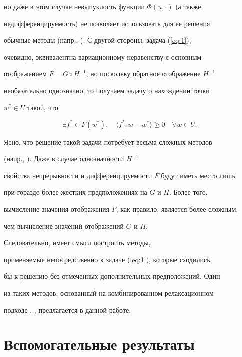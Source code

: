 но даже в этом случае невыпуклость функции $\Phi(u, \cdot)$ (а также 


недифференцируемость) не позволяет использовать для ее решения 


обычные методы (напр., \cite{Kon98}). С другой стороны, задача (\ref{eq:1}), 


очевидно, эквивалентна вариационному неравенству с основным 


отображением $F=G \circ H^{-1}$, но поскольку обратное отображение $H^{-1}$


необязательно однозначно, то получаем задачу о нахождении точки 


$w^{*} \in U$ такой, что


\begin{equation} \label{eq:5} 


\exists f^{*} \in F(w^{*}), \quad 


 \langle f^{*}, w - w^{*} \rangle \geq 0 \quad \forall w \in U. 


\end{equation}


Ясно, что решение такой задачи потребует весьма сложных методов 


(напр., \cite{Kon98}). Даже в случае однозначности $H^{-1}$


свойства непрерывности и дифференцируемости $F$ будут иметь место лишь


при гораздо более жестких предположениях на $G$ и $H$. Более того,


вычисление значения отображения $F$, как правило, является более сложным,


чем вычисление значений отображений $G$ и $H$.


Следовательно, имеет смысл построить методы, 


применяемые непосредственно к задаче (\ref{eq:1}), которые сходились 


бы к решению без отмеченных дополнительных предположений. Один 


из таких методов, основанный на комбинированном релаксационном 


подходе \cite{Kon93}, \cite{Kon01}, предлагается в данной работе. 








\section{Вспомогательные результаты}





